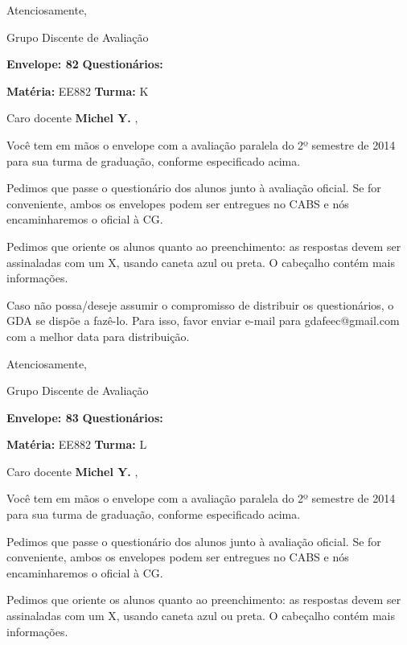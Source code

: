 \documentclass[a5paper]{letter}
\begin{document}
Atenciosamente, 

Grupo Discente de Avaliação

\vspace{0.5cm}

{\bf Envelope: 82 }		\hfill	{\bf Questionários:} \hspace{2cm}

\newpage
\thispagestyle{empty}

\hfill {\bf Matéria:} EE882 {\bf Turma:} K

Caro docente {\bf Michel Y. }, 

	Você tem em mãos o envelope com a avaliação paralela do 2º semestre de 2014 para sua turma de graduação, conforme especificado acima.

	Pedimos que passe o questionário dos alunos junto à avaliação oficial. Se for conveniente, ambos os envelopes podem ser entregues no CABS e nós encaminharemos o oficial à CG.

Pedimos que oriente os alunos quanto ao preenchimento: as respostas devem ser assinaladas com um X, usando caneta azul ou preta. O cabeçalho contém mais informações.

	Caso não possa/deseje assumir o compromisso de distribuir os questionários, o GDA se dispõe a fazê-lo. Para isso, favor enviar e-mail para gdafeec@gmail.com com a melhor data para distribuição.


Atenciosamente, 

Grupo Discente de Avaliação

\vspace{0.5cm}

{\bf Envelope: 83 }		\hfill	{\bf Questionários:} \hspace{2cm}

\newpage
\thispagestyle{empty}

\hfill {\bf Matéria:} EE882 {\bf Turma:} L

Caro docente {\bf Michel Y. }, 

	Você tem em mãos o envelope com a avaliação paralela do 2º semestre de 2014 para sua turma de graduação, conforme especificado acima.

	Pedimos que passe o questionário dos alunos junto à avaliação oficial. Se for conveniente, ambos os envelopes podem ser entregues no CABS e nós encaminharemos o oficial à CG.

Pedimos que oriente os alunos quanto ao preenchimento: as respostas devem ser assinaladas com um X, usando caneta azul ou preta. O cabeçalho contém mais informações.
\end{document}
